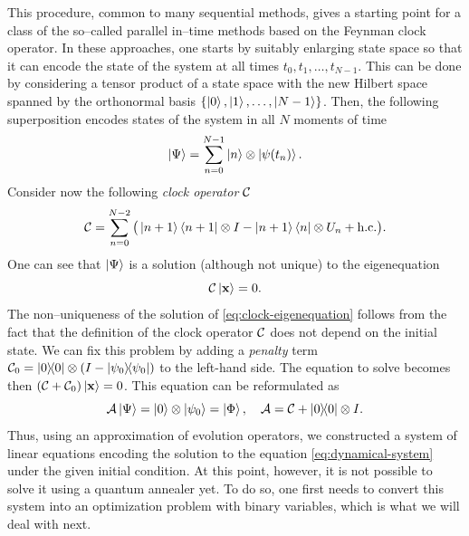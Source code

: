 This procedure, common to many sequential methods, gives a starting point for a class of the so--called parallel in--time methods based on the Feynman clock operator. In these approaches, one starts by suitably enlarging state space so that it can encode the state of the system at all times $t_0, t_1, \ldots, t_{N-1}$. This can be done by considering a tensor product of a state space with the new Hilbert space spanned by the orthonormal basis $\{\ket{0}, \ket{1}, \ldots, \ket{N-1}\}$. Then, the following superposition encodes states of the system in all $N$ moments of time
%
\begin{equation}
    \ket{\Psi} = \sum_{n=0}^{N-1} \ket{n} \otimes \ket{\psi(t_n)}.
\end{equation}
Consider now the following \emph{clock operator} $\mathcal{C}$
\begin{equation}
\label{eq:clock2}
 \mathcal{C}
   =
\sum_{n=0}^{N-2}
\big(
\ket{n+1}\bra{n+1} \otimes I - \ket{n+1}\bra{n} \otimes U_n
+ \text{h.c.}
\big).
\end{equation}
One can see that $\ket{\Psi}$ is a solution (although not unique) to the eigenequation
\begin{equation}
\label{eq:clock-eigenequation}
\mathcal{C} \ket{\mathbf{x}} = 0.
\end{equation}
The non--uniqueness of the solution of \ref{eq:clock-eigenequation} follows from the fact that the
definition of the clock operator $\mathcal{C}$ does not depend on the initial state.
We can fix this problem by adding a \emph{penalty} term $\mathcal{C}_0 = \ketbra{0}{0}\otimes(I-\ketbra{\psi_0}{\psi_0})$ to the
left-hand side. The equation to solve becomes then $(\mathcal{C} + \mathcal{C}_0) \ket{\mathbf{x}} = 0$.
This equation can be reformulated as
\begin{equation}
\label{eq:gsys}
\mathcal{A} \ket{\Psi}
=
\ket{0}\otimes \ket{\psi_0} = \ket{\Phi},
\quad
\mathcal{A}=\mathcal{C} + \ketbra{0}{0} \otimes I.
\end{equation}
Thus, using an approximation of evolution operators, we constructed a system of linear equations encoding the solution to the equation \eqref{eq:dynamical-system} under the given initial condition. At this point, however, it is not possible to solve it using a quantum annealer yet. To do so, one first needs to convert this system into an optimization problem
with binary variables, which is what we will deal with next.

